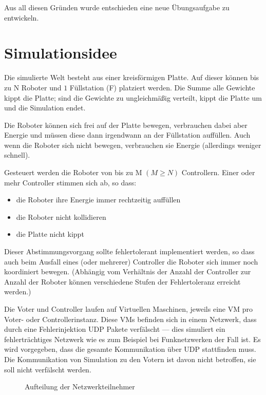 Aus all diesen Gr{\"{u}}nden wurde entschieden eine neue {\"{U}}bungsaufgabe zu entwickeln.

\clearpage
\section{Simulationsidee}
Die simulierte Welt besteht aus einer kreisf{\"{o}}rmigen Platte. Auf dieser k{\"{o}}nnen bis zu \gls{N} Roboter und $1$ F{\"{u}}llstation (\gls{F})
platziert werden. Die Summe alle Gewichte kippt die Platte; sind die Gewichte zu ungleichm{\"{a}}{\ss}ig verteilt, kippt
die Platte um und die Simulation endet.

Die Roboter k{\"{o}}nnen sich frei auf der Platte bewegen, verbrauchen dabei aber Energie und m{\"{u}}ssen diese dann irgendwann
an der F{\"{u}}llstation auff{\"{u}}llen. Auch wenn die Roboter sich nicht bewegen, verbrauchen sie Energie (allerdings weniger
schnell).

Gesteuert werden die Roboter von bis zu \gls{M} $(M \geq N)$ Controllern. Einer oder mehr Controller stimmen sich ab,
so dass:
\begin{itemize}
\item die Roboter ihre Energie immer rechtzeitig auff{\"{u}}llen
\item die Roboter nicht kollidieren
\item die Platte nicht kippt
\end{itemize}

Dieser Abstimmungsvorgang sollte fehlertolerant implementiert werden, so dass auch beim Ausfall eines (oder mehrerer) Controller die Roboter sich immer noch koordiniert bewegen.
(Abh{\"{a}}ngig vom Verh{\"{a}}ltnis der Anzahl der Controller zur Anzahl der Roboter k{\"{o}}nnen verschiedene Stufen der Fehlertoleranz erreicht werden.\cite[s.149]{Werner00})

Die Voter und Controller laufen auf Virtuellen Maschinen, jeweils eine VM pro Voter- oder Controllerinstanz.
Diese VMs befinden sich in einem Netzwerk, dass durch eine Fehlerinjektion UDP Pakete verf{\"{a}}lscht --- dies simuliert ein fehlertr{\"{a}}chtiges Netzwerk wie es zum Beispiel bei Funknetzwerken der Fall ist.
Es wird vorgegeben, dass die gesamte Kommunikation {\"{u}}ber UDP stattfinden muss. Die Kommunikation von Simulation zu den Votern ist davon nicht betroffen, sie soll nicht verf{\"{a}}lscht werden.

\begin{figure}
	\centering
	\caption{Aufteilung der Netzwerkteilnehmer}
	\label{fig:network}
\end{figure}

